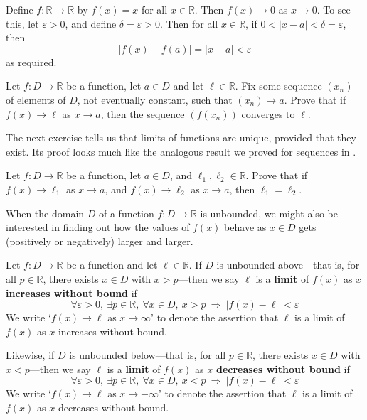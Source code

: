\begin{example}
Define $f : \mathbb{R} \to \mathbb{R}$ by $f(x) = x$ for all $x \in \mathbb{R}$. Then $f(x) \to 0$ as $x \to 0$. To see this, let $\varepsilon > 0$, and define $\delta = \varepsilon > 0$. Then for all $x \in \mathbb{R}$, if $0 < |x-a| < \delta = \varepsilon$, then
\[ |f(x) - f(a)| = |x-a| < \varepsilon \]
as required.
\end{example}

\begin{exercise}
Let $f : D \to \mathbb{R}$ be a function, let $a \in D$ and let $\ell \in \mathbb{R}$. Fix some sequence $(x_n)$ of elements of $D$, not eventually constant, such that $(x_n) \to a$. Prove that if $f(x) \to \ell$ as $x \to a$, then the sequence $(f(x_n))$ converges to $\ell$.
\end{exercise}

The next exercise tells us that limits of functions are unique, provided that they exist. Its proof looks much like the analogous result we proved for sequences in .

\begin{exercise}
\label{exLimitsOfFunctionsAreUnique}
Let $f : D \to \mathbb{R}$ be a function, let $a \in D$, and $\ell_1, \ell_2 \in \mathbb{R}$. Prove that if $f(x) \to \ell_1$ as $x \to a$, and $f(x) \to \ell_2$ as $x \to a$, then $\ell_1=\ell_2$.
\end{exercise}

When the domain $D$ of a function $f : D \to \mathbb{R}$ is unbounded, we might also be interested in finding out how the values of $f(x)$ behave as $x \in D$ gets (positively or negatively) larger and larger.

\begin{definition}
\label{defInfiniteLimitOfFunction}
Let $f : D \to \mathbb{R}$ be a function and let $\ell \in \mathbb{R}$. If $D$ is unbounded above---that is, for all $p \in \mathbb{R}$, there exists $x \in D$ with $x > p$---then we say $\ell$ is a \textbf{limit} of $f(x)$ as $x$ \textbf{increases without bound} if
\[ \forall \varepsilon > 0, ~ \exists p \in \mathbb{R},~ \forall x \in D,~ x > p ~\Rightarrow~ |f(x) - \ell| < \varepsilon\]
We write `$f(x) \to \ell$ as $x \to \infty$'  to denote the assertion that $\ell$ is a limit of $f(x)$ as $x$ increases without bound.

Likewise, if $D$ is unbounded below---that is, for all $p \in \mathbb{R}$, there exists $x \in D$ with $x < p$---then we say $\ell$ is a \textbf{limit} of $f(x)$ as $x$ \textbf{decreases without bound} if
\[ \forall \varepsilon > 0, ~ \exists p \in \mathbb{R},~ \forall x \in D,~ x < p ~\Rightarrow~ |f(x) - \ell| < \varepsilon\]
We write `$f(x) \to \ell$ as $x \to -\infty$' to denote the assertion that $\ell$ is a limit of $f(x)$ as $x$ decreases without bound.
\end{definition}

